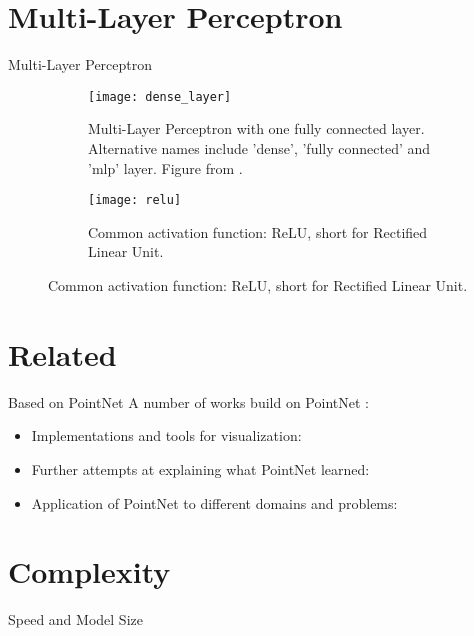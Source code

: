 \section{Multi-Layer Perceptron}
\begin{frame}[c]{Multi-Layer Perceptron}
    \begin{figure}
        \begin{subfigure}{0.6\textwidth}
            \centering
            \texttt{[image: dense\_layer]}
            \caption{Multi-Layer Perceptron with one fully connected layer. Alternative names include 'dense', 'fully connected' and 'mlp' layer. Figure from \cite{BibEntry2018Aug}.}
        \end{subfigure}
        \hspace{3em}
        \begin{subfigure}{0.3\textwidth}
            \texttt{[image: relu]}
            \caption{Common activation function: ReLU, short for Rectified Linear Unit.}
        \end{subfigure}
    \end{figure}
\end{frame}


\section{Related}
\begin{frame}[c]{Based on PointNet}
    \Large
    A number of works build on PointNet \cite{qi2017pointnet}:
    \begin{itemize}
        \item Implementations and tools for visualization: \cite{charlesq342022Jun, aldipiroli2022Jun, yunxiaoshi2022Jun, Pytorch_Pointnet_Pointnet2}
        \item Further attempts at explaining what PointNet learned: \cite{zhang2019explaining, huang2019claim}
        \item Application of PointNet to different domains and problems: \cite{thiery2022medical, gutierrez2018deep, triess2021survey, liang2019multi, zhang2018collaborative, mrowca2018flexible}
    \end{itemize}
\end{frame}



\section{Complexity}
\begin{frame}[c]{Speed and Model Size}
    \large
    
\end{frame}

